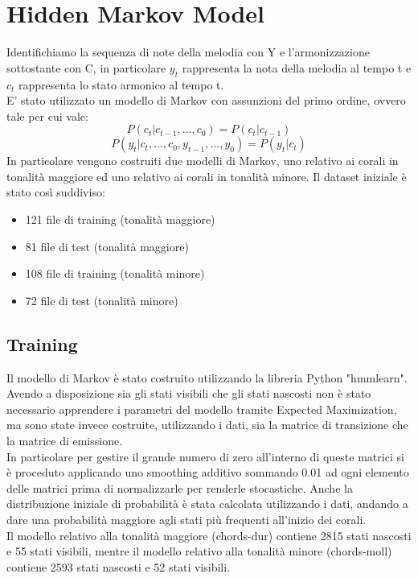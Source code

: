 \chapter{Hidden Markov Model}\label{ch:hmm-chords}
Identifichiamo la sequenza di note della melodia con Y e l'armonizzazione sottostante con C, in particolare $y_t$ rappresenta la nota della melodia al tempo t e $c_t$ rappresenta lo stato armonico al tempo t. \\
E' stato utilizzato un modello di Markov con assunzioni del primo ordine, ovvero tale per cui vale:
\begin{equation}
P(c_t|c_{t-1},...,c_0) = P(c_t|c_{t-1})
\end{equation}
\begin{equation}
P(y_t|c_t,...,c_0,y_{t-1},...,y_0) = P(y_t|c_t)
\end{equation}
In particolare vengono costruiti due modelli di Markov, uno relativo ai corali in tonalità maggiore ed uno relativo ai corali in tonalità minore.
Il dataset iniziale è stato così suddiviso:
\begin{itemize}
\item 121 file di training (tonalità maggiore)
\item 81 file di test (tonalità maggiore)
\item 108 file di training (tonalità minore)
\item 72 file di test (tonalità minore)
\end{itemize}
\section{Training}
Il modello di Markov è stato costruito utilizzando la libreria Python "hmmlearn". \\
Avendo a disposizione sia gli stati visibili che gli stati nascosti non è stato necessario apprendere i parametri del modello tramite Expected Maximization, ma sono state invece costruite, utilizzando i dati, sia la matrice di transizione che la matrice di emissione.\\
In particolare per gestire il grande numero di zero all'interno di queste matrici si è proceduto applicando uno smoothing additivo sommando 0.01 ad ogni elemento delle matrici prima di normalizzarle per renderle stocastiche.
Anche la distribuzione iniziale di probabilità è stata calcolata utilizzando i dati, andando a dare una probabilità maggiore agli stati più frequenti all'inizio dei corali. \\
Il modello relativo alla tonalità maggiore (chords-dur) contiene 2815 stati nascosti e 55 stati visibili, mentre il modello relativo alla tonalità minore (chords-moll) contiene 2593 stati nascosti e 52 stati visibili.
